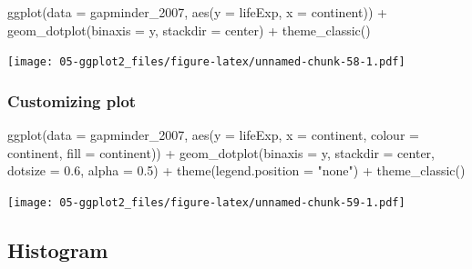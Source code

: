 \documentclass[
]{book}
\newenvironment{Shaded}{\begin{snugshade}}{\end{snugshade}}
\newcommand{\AttributeTok}[1]{\textcolor[rgb]{0.77,0.63,0.00}{#1}}
\newcommand{\FloatTok}[1]{\textcolor[rgb]{0.00,0.00,0.81}{#1}}
\newcommand{\FunctionTok}[1]{\textcolor[rgb]{0.00,0.00,0.00}{#1}}
\newcommand{\NormalTok}[1]{#1}
\newcommand{\SpecialCharTok}[1]{\textcolor[rgb]{0.00,0.00,0.00}{#1}}
\newcommand{\StringTok}[1]{\textcolor[rgb]{0.31,0.60,0.02}{#1}}
\begin{document}
\begin{Shaded}
\begin{Highlighting}[]
\FunctionTok{ggplot}\NormalTok{(}\AttributeTok{data =}\NormalTok{ gapminder\_2007, }\FunctionTok{aes}\NormalTok{(}\AttributeTok{y =}\NormalTok{ lifeExp, }\AttributeTok{x =}\NormalTok{ continent)) }\SpecialCharTok{+} 
   \FunctionTok{geom\_dotplot}\NormalTok{(}\AttributeTok{binaxis =} \StringTok{\textquotesingle{}y\textquotesingle{}}\NormalTok{, }\AttributeTok{stackdir =} \StringTok{\textquotesingle{}center\textquotesingle{}}\NormalTok{) }\SpecialCharTok{+}
   \FunctionTok{theme\_classic}\NormalTok{()}
\end{Highlighting}
\end{Shaded}

\texttt{[image: 05-ggplot2\_files/figure-latex/unnamed-chunk-58-1.pdf]}

\hypertarget{customizing-plot-2}{%
\subsubsection{Customizing plot}\label{customizing-plot-2}}

\begin{Shaded}
\begin{Highlighting}[]
\FunctionTok{ggplot}\NormalTok{(}\AttributeTok{data =}\NormalTok{ gapminder\_2007, }
\FunctionTok{aes}\NormalTok{(}\AttributeTok{y =}\NormalTok{ lifeExp, }\AttributeTok{x =}\NormalTok{ continent, }\AttributeTok{colour =}\NormalTok{ continent, }\AttributeTok{fill =}\NormalTok{ continent)) }\SpecialCharTok{+} 
   \FunctionTok{geom\_dotplot}\NormalTok{(}\AttributeTok{binaxis =} \StringTok{\textquotesingle{}y\textquotesingle{}}\NormalTok{, }\AttributeTok{stackdir =} \StringTok{\textquotesingle{}center\textquotesingle{}}\NormalTok{, }\AttributeTok{dotsize =} \FloatTok{0.6}\NormalTok{, }\AttributeTok{alpha =} \FloatTok{0.5}\NormalTok{) }\SpecialCharTok{+}
   \FunctionTok{theme}\NormalTok{(}\AttributeTok{legend.position =} \StringTok{"none"}\NormalTok{) }\SpecialCharTok{+}
   \FunctionTok{theme\_classic}\NormalTok{()}
\end{Highlighting}
\end{Shaded}

\texttt{[image: 05-ggplot2\_files/figure-latex/unnamed-chunk-59-1.pdf]}

\hypertarget{histogram}{%
\subsection{Histogram}\label{histogram}}
\end{document}
